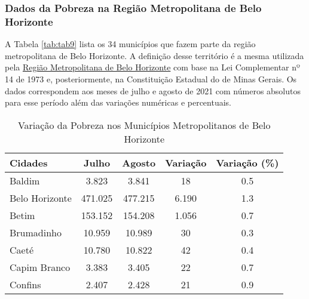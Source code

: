 \documentclass[12pt]{article}
\begin{document}
\subsubsection{Dados da Pobreza na Região Metropolitana de Belo Horizonte}
\label{pobreza_metropolitana}

A Tabela \ref{tab:tab9} lista os 34 municípios que fazem parte da região metropolitana de Belo Horizonte. A definição desse território é a mesma utilizada pela \href{http://www.rmbh.org.br/rmbh.php}{Região Metropolitana de Belo Horizonte} com base na Lei Complementar nº 14 de 1973 e, posteriormente, na Constituição Estadual do de Minas Gerais. Os dados correspondem aos meses de julho e agosto de 2021 com números absolutos para esse período além das variações numéricas e percentuais.

\begin{table}[htbp]
  \centering
  \caption{Variação da Pobreza nos Municípios Metropolitanos de Belo Horizonte}
    \tabcolsep=0.15cm
	\renewcommand{\arraystretch}{1.0}
	\begin{adjustbox}{max width=\linewidth}
    \begin{tabular}{lcccc}
    \hline
    Cidades & Julho & Agosto & Variação & Variação (\%) \\
    \hline
    Baldim & \textcolor[rgb]{ .2,  .2,  .2}{3.823} & \textcolor[rgb]{ .2,  .2,  .2}{3.841} & \textcolor[rgb]{ .2,  .2,  .2}{18} & 0.5 \\
    \rowcolor[rgb]{ .851,  .851,  .851} Belo Horizonte & \textcolor[rgb]{ .2,  .2,  .2}{471.025} & \textcolor[rgb]{ .2,  .2,  .2}{477.215} & \textcolor[rgb]{ .2,  .2,  .2}{6.190} & 1.3 \\
    Betim & \textcolor[rgb]{ .2,  .2,  .2}{153.152} & \textcolor[rgb]{ .2,  .2,  .2}{154.208} & \textcolor[rgb]{ .2,  .2,  .2}{1.056} & 0.7 \\
    Brumadinho & \textcolor[rgb]{ .2,  .2,  .2}{10.959} & \textcolor[rgb]{ .2,  .2,  .2}{10.989} & \textcolor[rgb]{ .2,  .2,  .2}{30} & 0.3 \\
    Caeté & \textcolor[rgb]{ .2,  .2,  .2}{10.780} & \textcolor[rgb]{ .2,  .2,  .2}{10.822} & \textcolor[rgb]{ .2,  .2,  .2}{42} & 0.4 \\
    Capim Branco & \textcolor[rgb]{ .2,  .2,  .2}{3.383} & \textcolor[rgb]{ .2,  .2,  .2}{3.405} & \textcolor[rgb]{ .2,  .2,  .2}{22} & 0.7 \\
    Confins & \textcolor[rgb]{ .2,  .2,  .2}{2.407} & \textcolor[rgb]{ .2,  .2,  .2}{2.428} & \textcolor[rgb]{ .2,  .2,  .2}{21} & 0.9 \\

\end{tabular}
\end{adjustbox}
\end{table}
\end{document}
